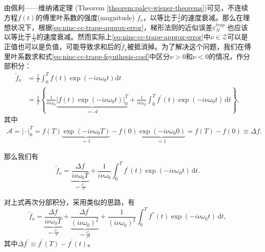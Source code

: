 由佩利——维纳诸定理 (Theorem \ref{theorem:paley-wiener-theorems})可见，不连续方程$f(t)$的傅里叶系数的强度(magnitude) $\tilde{f}_{\nu}$，以等比于$\frac{1}{\nu}$的速度衰减。那么在理想状况下，根据\eqref{eq:ninc-cc-trape-approx-error}，梯形法则的近似误差$\varepsilon_{N}^{trap}$
也应该以等比于$\frac{1}{N}$的速度衰减。然而实际上\eqref{eq:ninc-cc-trape-approx-error}中$\nu \in \mathcal{Z}$可以是正值也可以是负值，可能导致求和后的$\tilde{f}_{\nu}$被抵消掉。为了解决这个问题，我们在傅里叶系数求和式\eqref{eq:ninc-cc-trape-fsynthesis-coef}中区分$\nu>0$和$\nu <0$的情况，作分部积分\citep[Sec 2.9]{Boyd:2001wt}：
\begin{equation*}
  \begin{split}
    \tilde{f}_{\nu} & = \frac{1}{T} \int_{0}^{T} f(t) \exp \left( - i \nu \omega_{0} t \right) \mathrm{d} t \\
    & = \frac{1}{T} \left\{
    \frac{1}{i \nu \omega_{0}}
    \underbrace{
    \Big|
    f(t) \exp \left( - i \nu \omega_{0} t \right)
    \Big|_{0}^{T}
    }_{\eqqcolon \mathcal{A}}
    + \frac{1}{i \nu \omega_{0}}
    \int_{0}^{T} f^{'}(t) \exp \left( - i \nu \omega_{0} t \right) \, \mathrm{d} t
    \right\},
  \end{split}
\end{equation*}
其中
\begin{equation*}
  \begin{split}
    \mathcal{A} = \big| \cdot \big|_{0}^{T} = f(T)
    \underbrace{\exp \left( - i \nu \omega_{0} T \right)}_{=1} - f(0) \underbrace{\exp \left( - i \nu \omega_{0} 0 \right)}_{=1} = f(T) - f(0) \equiv \Delta f.
  \end{split}
\end{equation*}

那么我们有
\begin{equation*}
  \tilde{f}_{\nu} = \underbrace{
  \frac{\Delta f}{i \nu \omega_{0} T}
  }_{\eqqcolon \frac{C_{1}}{\nu}}
  + \frac{1}{i \nu \omega_{0}}
  \int_{0}^{T} f^{'}(t) \exp \left( - i \nu \omega_{0} t \right) \, \mathrm{d} t.
\end{equation*}

对上式再次分部积分，采用类似的思路，有
\begin{equation*}
  \tilde{f}_{\nu} = \underbrace{
  \frac{\Delta f}{i \nu \omega_{0} T}
  }_{\eqqcolon \frac{C_{1}}{\nu}}
  +
  \underbrace{
  \frac{\Delta f^{'}}{\left( i \nu \omega_{0} \right)^{2}}
  }_{\eqqcolon \frac{C_{2}}{\nu^{2}}}
   + \frac{1}{\left( i \nu \omega_{0} \right)^{2}} \int_{0}^{T} f^{''}(t) \exp \left( - i \nu \omega_{0} t \right) \, \mathrm{d} t,
\end{equation*}
其中$\Delta f^{'} \equiv f^{'}(T) - f^{'}(t)$。

